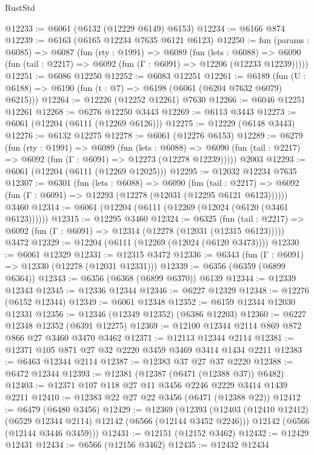 \begin{lexlean}{RustStd}
\begin{coremodule}
@12233 := @6061 (@6132 (@12229 @6149) @6153)
@12234 := @6166 @874
@12239 := @6163 (@6165 @12234 @7635 @6121 @6123)
@12250 := fun (params : @6085) =>
  @6087
    (fun (rty : @1991) =>
    @6089
      (fun (lets : @6088) =>
      @6090 (fun (tail : @2217) => @6092 (fun (Γ : @6091) => @12206 (@12233 @12239)))))
@12251 := @6086 @12250
@12252 := @6083 @12251
@12261 := @6189 (fun (U : @6188) => @6190 (fun (t : @7) => @6198 (@6061 (@6204 @7632 @6079) @6215)))
@12264 := @12226 (@12252 @12261) @7630
@12266 := @6046 @12251 @12261
@12268 := @6276 @12250 @3443
@12269 := @6113 @3443
@12273 := @6061 (@12204 (@6111 (@12269 @6126)))
@12275 := @12229 (@6148 @3443)
@12276 := @6132 @12275
@12278 := @6061 (@12276 @6153)
@12289 := @6279
    (fun (rty : @1991) =>
    @6089
      (fun (lets : @6088) =>
      @6090 (fun (tail : @2217) => @6092 (fun (Γ : @6091) => @12273 (@12278 @12239)))))
    @2003
@12293 := @6061 (@12204 (@6111 (@12269 @12025)))
@12295 := @12032 @12234 @7635
@12307 := @6301
    (fun (lets : @6088) =>
    @6090
      (fun (tail : @2217) =>
      @6092 (fun (Γ : @6091) => @12293 (@12278 (@12031 (@12295 @6121 @6123))))))
    @3460
@12314 := @6061 (@12204 (@6111 (@12269 (@12024 (@6120 (@3461 @6123))))))
@12315 := @12295 @3460
@12324 := @6325
    (fun (tail : @2217) => @6092 (fun (Γ : @6091) => @12314 (@12278 (@12031 (@12315 @6123)))))
    @3472
@12329 := @12204 (@6111 (@12269 (@12024 (@6120 @3473))))
@12330 := @6061 @12329
@12331 := @12315 @3472
@12336 := @6343 (fun (Γ : @6091) => @12330 (@12278 (@12031 @12331)))
@12339 := @6356 (@6359 (@6899 @6364))
@12343 := @6356 (@6368 (@6899 @6370)) @6139
@12344 := @12339 @12343
@12345 := @12336 @12344
@12346 := @6227 @12329
@12348 := @12276 (@6152 @12344)
@12349 := @6061 @12348
@12352 := @6159 @12344 @12030 @12331
@12356 := @12346 (@12349 @12352) (@6386 @12203)
@12360 := @6227 @12348 @12352 (@6391 @12275)
@12369 := @12100 @12344 @2114 @869 @872 @866 @27 @3460 @3470 @3462
@12371 := @12113 @12344 @2114
@12381 := @12371 @105 @871 @27 @32 @2220 @3459 @3469 @3414 @1434 @2211
@12383 := @6463 @12344 @2114
@12387 := @12383 @37 @27 @37 @2220
@12388 := @6472 @12344
@12393 := @12381 (@12387 (@6471 (@12388 @37)) @6482)
@12403 := @12371 @107 @118 @27 @11 @3456 @2246 @2229 @3414 @1439 @2211
@12410 := @12383 @22 @27 @22 @3456 (@6471 (@12388 @22))
@12412 := @6479 (@6480 @3456)
@12429 := @12369
    (@12393
      (@12403 (@12410 @12412) (@6529 @12344 @2114) @12142 (@6566 (@12144 @3452 @2246)))
      @12142
      (@6566 (@12144 @3446 @3459)))
@12431 := @12151 (@12152 @3462)
@12432 := @12429 @12431
@12434 := @6566 (@12156 @3462)
@12435 := @12432 @12434

\end{coremodule}
\end{lexlean}
